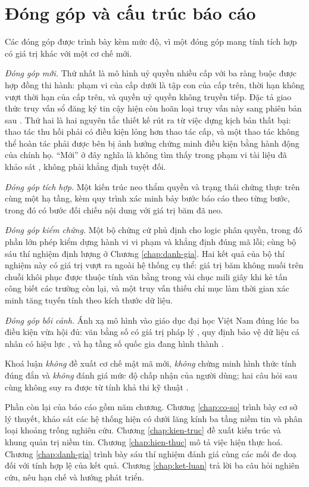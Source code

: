 \section{Đóng góp và cấu trúc báo cáo}
\label{sec:dong-gop}

Các đóng góp được trình bày kèm mức độ, vì một đóng góp mang tính tích hợp có giá trị khác với một cơ chế mới.

\textit{Đóng góp mới.} Thứ nhất là mô hình uỷ quyền nhiều cấp với ba ràng buộc được hợp đồng thi hành: phạm vi của cấp dưới là tập con của cấp trên, thời hạn không vượt thời hạn của cấp trên, và quyền uỷ quyền không truyền tiếp. Đặc tả giao thức truy vấn sổ đăng ký tin cậy hiện còn hoãn loại truy vấn này sang phiên bản sau \cite{ToIP_TRQP2026}. Thứ hai là hai nguyên tắc thiết kế rút ra từ việc dựng kịch bản thất bại: thao tác thu hồi phải có điều kiện lỏng hơn thao tác cấp, và một thao tác không thể hoàn tác phải được bên bị ảnh hưởng chứng minh điều kiện bằng hành động của chính họ. ``Mới'' ở đây nghĩa là không tìm thấy trong phạm vi tài liệu đã khảo sát \cite{Krul2024, Turco2026, Ambati2026}, không phải khẳng định tuyệt đối.

\textit{Đóng góp tích hợp.} Một kiến trúc neo thẩm quyền và trạng thái chứng thực trên cùng một hạ tầng, kèm quy trình xác minh bảy bước báo cáo theo từng bước, trong đó có bước đối chiếu nội dung với giá trị băm đã neo.

\textit{Đóng góp kiểm chứng.} Một bộ chứng cứ phủ định cho logic phân quyền, trong đó phần lớn phép kiểm dựng hành vi vi phạm và khẳng định đúng mã lỗi; cùng bộ sáu thí nghiệm định lượng ở Chương \ref{chap:danh-gia}. Hai kết quả của bộ thí nghiệm này có giá trị vượt ra ngoài hệ thống cụ thể: giá trị băm không muối trên chuỗi khôi phục được thuộc tính văn bằng trong vài chục mili giây khi kẻ tấn công biết các trường còn lại, và một truy vấn thiếu chỉ mục làm thời gian xác minh tăng tuyến tính theo kích thước dữ liệu.

\textit{Đóng góp bối cảnh.} Ánh xạ mô hình vào giáo dục đại học Việt Nam đúng lúc ba điều kiện vừa hội đủ: văn bằng số có giá trị pháp lý \cite{TT10_2026}, quy định bảo vệ dữ liệu cá nhân có hiệu lực \cite{LuatBVDLCN2025}, và hạ tầng số quốc gia đang hình thành \cite{NDAChain2025}.

Khoá luận \emph{không} đề xuất cơ chế mật mã mới, \emph{không} chứng minh hình thức tính đúng đắn và \emph{không} đánh giá mức độ chấp nhận của người dùng; hai câu hỏi sau cùng không suy ra được từ tính khả thi kỹ thuật \cite{SSI_Adoption2025}.

Phần còn lại của báo cáo gồm năm chương. Chương \ref{chap:co-so} trình bày cơ sở lý thuyết, khảo sát các hệ thống hiện có dưới lăng kính ba tầng niềm tin và phân loại khoảng trống nghiên cứu. Chương \ref{chap:kien-truc} đề xuất kiến trúc và khung quản trị niềm tin. Chương \ref{chap:hien-thuc} mô tả việc hiện thực hoá. Chương \ref{chap:danh-gia} trình bày sáu thí nghiệm đánh giá cùng các mối đe doạ đối với tính hợp lệ của kết quả. Chương \ref{chap:ket-luan} trả lời ba câu hỏi nghiên cứu, nêu hạn chế và hướng phát triển.

